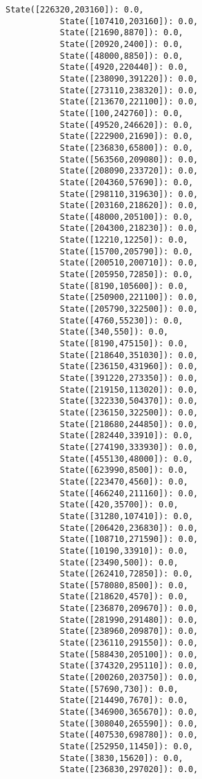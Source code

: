 \documentclass[11pt]{article}
\begin{document}
\begin{Verbatim}[commandchars=\\\{\}]
           State([226320,203160]): 0.0,
           State([107410,203160]): 0.0,
           State([21690,8870]): 0.0,
           State([20920,2400]): 0.0,
           State([48000,8850]): 0.0,
           State([4920,220440]): 0.0,
           State([238090,391220]): 0.0,
           State([273110,238320]): 0.0,
           State([213670,221100]): 0.0,
           State([100,242760]): 0.0,
           State([49520,246620]): 0.0,
           State([222900,21690]): 0.0,
           State([236830,65800]): 0.0,
           State([563560,209080]): 0.0,
           State([208090,233720]): 0.0,
           State([204360,57690]): 0.0,
           State([298110,319630]): 0.0,
           State([203160,218620]): 0.0,
           State([48000,205100]): 0.0,
           State([204300,218230]): 0.0,
           State([12210,12250]): 0.0,
           State([15700,205790]): 0.0,
           State([200510,200710]): 0.0,
           State([205950,72850]): 0.0,
           State([8190,105600]): 0.0,
           State([250900,221100]): 0.0,
           State([205790,322500]): 0.0,
           State([4760,55230]): 0.0,
           State([340,550]): 0.0,
           State([8190,475150]): 0.0,
           State([218640,351030]): 0.0,
           State([236150,431960]): 0.0,
           State([391220,273350]): 0.0,
           State([219150,113020]): 0.0,
           State([322330,504370]): 0.0,
           State([236150,322500]): 0.0,
           State([218680,244850]): 0.0,
           State([282440,33910]): 0.0,
           State([274190,333930]): 0.0,
           State([455130,48000]): 0.0,
           State([623990,8500]): 0.0,
           State([223470,4560]): 0.0,
           State([466240,211160]): 0.0,
           State([420,35700]): 0.0,
           State([31280,107410]): 0.0,
           State([206420,236830]): 0.0,
           State([108710,271590]): 0.0,
           State([10190,33910]): 0.0,
           State([23490,500]): 0.0,
           State([262410,72850]): 0.0,
           State([578080,8500]): 0.0,
           State([218620,4570]): 0.0,
           State([236870,209670]): 0.0,
           State([281990,291480]): 0.0,
           State([238960,209870]): 0.0,
           State([236110,291550]): 0.0,
           State([588430,205100]): 0.0,
           State([374320,295110]): 0.0,
           State([200260,203750]): 0.0,
           State([57690,730]): 0.0,
           State([214490,7670]): 0.0,
           State([346900,365670]): 0.0,
           State([308040,265590]): 0.0,
           State([407530,698780]): 0.0,
           State([252950,11450]): 0.0,
           State([3830,15620]): 0.0,
           State([236830,297020]): 0.0,

\end{Verbatim}
\end{document}
